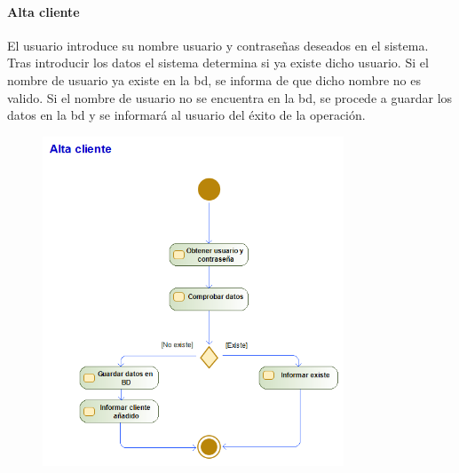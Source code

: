 \paragraph{Alta cliente}
El usuario introduce su nombre usuario y contraseñas deseados en el sistema. Tras introducir los datos el sistema determina si ya existe dicho usuario. Si el nombre de usuario ya existe en la \gls{bd}, se informa de que dicho nombre no es valido. Si el nombre de usuario no se encuentra en la \gls{bd}, se procede a guardar los datos en la \gls{bd} y se informará al usuario del éxito de la operación.
\begin{figure}[H]
    \centering
    \includegraphics[width=0.8\textwidth]{Use_Cases/alta_cliente.png}
\end{figure}
